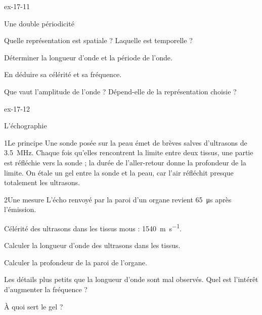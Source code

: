 \begin{blocLivre}{ex-17-11}
\begin{exercice}[2]{Une double périodicité}
\begin{questions}
\item Quelle représentation est spatiale ? Laquelle est temporelle ?
\item Déterminer la longueur d'onde et la période de l'onde.
\item En déduire sa célérité et sa fréquence.
\item Que vaut l'amplitude de l'onde ? Dépend-elle de la représentation choisie ?
\end{questions}
\end{exercice}
\end{blocLivre}
\begin{blocLivre}{ex-17-12}
\begin{exercice}[3]{L'échographie}
\begin{docu}{1}{Le principe}
Une sonde posée sur la peau émet de brèves salves d'ultrasons de \qty{3,5}{MHz}. Chaque fois qu'elles rencontrent la limite entre deux
tissus, une partie est réfléchie vers la sonde ; la durée de l'aller-retour donne la profondeur de la limite. On étale un gel entre
la sonde et la peau, car l'air réfléchit presque totalement les ultrasons.
\end{docu}
\begin{docu}{2}{Une mesure}
L'écho renvoyé par la paroi d'un organe revient \qty{65}{\micro s} après l'émission.
\end{docu}
\begin{donnees}
Célérité des ultrasons dans les tissus mous : \qty{1540}{m.s^{-1}}.
\end{donnees}
\begin{questions}
\item Calculer la longueur d'onde des ultrasons dans les tissus.
\item Calculer la profondeur de la paroi de l'organe.
\item \initiative Les détails plus petits que la longueur d'onde sont mal observés. Quel est l'intérêt d'augmenter la fréquence ?
\item À quoi sert le gel ?
\end{questions}
\end{exercice}
\end{blocLivre}
